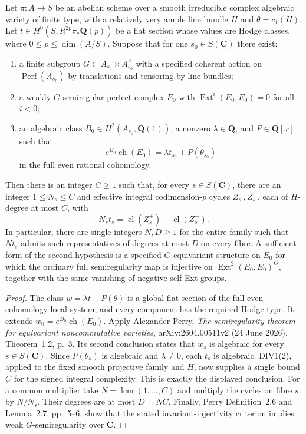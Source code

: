 \begin{proposition}
\label{prop:semireg-perry-bounded-division}
Let $\pi:A\to S$ be an abelian scheme over a smooth irreducible
complex algebraic variety of finite type, with a relatively very
ample line bundle $H$ and $\theta=c_1(H)$. Let
$t\in H^0(S,R^{2p}\pi_*\mathbf Q(p))$ be a flat section whose values
are Hodge classes, where $0\leq p\leq\dim(A/S)$.
Suppose that for one $s_0\in S(\mathbf C)$ there exist:
\begin{enumerate}
\item a finite subgroup $G\subset A_{s_0}\times A_{s_0}^{\vee}$
with a specified coherent action on $\operatorname{Perf}(A_{s_0})$
by translations and tensoring by line bundles;
\item a weakly $G$-semiregular perfect complex $E_0$ with
$\operatorname{Ext}^{i}(E_0,E_0)=0$ for all $i<0$;
\item an algebraic class $B_0\in H^2(A_{s_0},\mathbf Q(1))$,
a nonzero $\lambda\in\mathbf Q$, and $P\in\mathbf Q[x]$ such that
\[
 e^{B_0}\operatorname{ch}(E_0)=\lambda t_{s_0}+P(\theta_{s_0})
\]
in the full even rational cohomology.
\end{enumerate}
Then there is an integer $C\geq1$ such that, for every
$s\in S(\mathbf C)$, there are an integer $1\leq N_s\leq C$
and effective integral codimension-$p$ cycles $Z_s^+,Z_s^-$,
each of $H$-degree at most $C$, with
\[
 N_s t_s=\operatorname{cl}(Z_s^+)-\operatorname{cl}(Z_s^-).
\]
In particular, there are single integers $N,D\geq1$ for the entire
family such that $Nt_s$ admits such representatives of degrees
at most $D$ on every fibre.
A sufficient form of the second hypothesis is a specified
$G$-equivariant structure on $E_0$ for which the ordinary full
semiregularity map is injective on
$\operatorname{Ext}^2(E_0,E_0)^G$, together with the same vanishing
of negative self-Ext groups.
\end{proposition}
\begin{proof}
The class
$w=\lambda t+P(\theta)$ is a global flat section of the full even
cohomology local system, and every component has the required
Hodge type. It extends
$w_0=e^{B_0}\operatorname{ch}(E_0)$.
Apply Alexander Perry, \emph{The semiregularity theorem for
equivariant noncommutative varieties},
arXiv:2604.00511v2 (24 June 2026), Theorem~1.2, p.~3.
Its second conclusion states that $w_s$ is algebraic for every
$s\in S(\mathbf C)$. Since $P(\theta_s)$ is algebraic and
$\lambda\ne0$, each $t_s$ is algebraic.
DIV1(2), applied to the fixed smooth projective family and $H$,
now supplies a single bound $C$ for the signed integral complexity.
This is exactly the displayed conclusion.
For a common multiplier take $N=\operatorname{lcm}(1,\ldots,C)$
and multiply the cycles on fibre $s$ by $N/N_s$.
Their degrees are at most $D=NC$.
Finally, Perry Definition~2.6 and Lemma~2.7, pp.~5--6, show that
the stated invariant-injectivity criterion implies weak
$G$-semiregularity over $\mathbf C$.
\end{proof}

